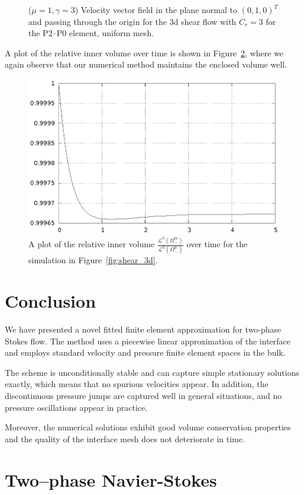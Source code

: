 \documentclass[a4paper,11pt,onecolumn]{article}
\begin{document}
\begin{figure}[htbp]
\centering
{}
\caption{($\mu=1,\gamma=3$) Velocity vector field in the plane normal to
$(0,1,0)^T$ and passing through the origin for the 3d shear flow with $C_r=3$
for the P2--P0 element, uniform mesh.}
\label{fig:shear_3d_velocity}
\end{figure}
A plot of the relative inner volume over time is shown in
Figure~\ref{fig:shear_3d_bulk_inner_volume}, where we again observe that our
numerical method maintains the enclosed volume well.

\begin{figure}[htbp]
\centering
\includegraphics[width=.45\textwidth]
{../stokes/figures/3d_shear_bulk_inner_volume.ps}
\caption{A plot of the relative inner volume
$\frac{\mathcal{L}^3(\Omega^m_-)}{\mathcal{L}^3(\Omega^0_-)}$
over time for the simulation in Figure~\ref{fig:shear_3d}.}
\label{fig:shear_3d_bulk_inner_volume}
\end{figure}

\section{Conclusion}\label{sec:conclusion}
We have presented a novel fitted finite element approximation for two-phase
Stokes flow. The method uses a piecewise linear approximation of the interface
and employs standard velocity and pressure finite element spaces in the bulk.

The scheme is unconditionally stable and can capture simple stationary
solutions exactly, which means that no spurious velocities appear. In addition,
the discontinuous pressure jumps are captured well in general situations, and
no pressure oscillations appear in practice.

Moreover, the numerical solutions exhibit good volume conservation properties
and the quality of the interface mesh does not deteriorate in time.

\section{Two--phase Navier-Stokes}
\end{document}
